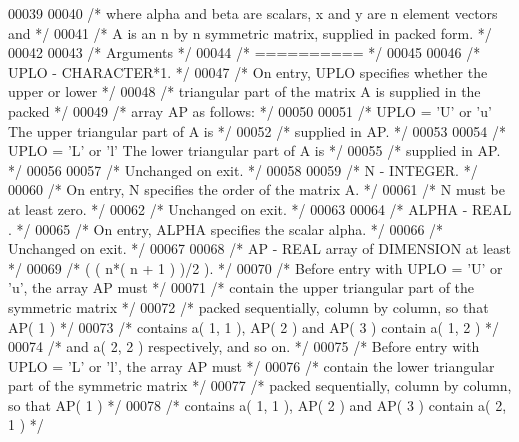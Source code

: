 \begin{DoxyCode}
00039 
00040 \textcolor{comment}{/*  where alpha and beta are scalars, x and y are n element vectors and */}
00041 \textcolor{comment}{/*  A is an n by n symmetric matrix, supplied in packed form. */}
00042 
00043 \textcolor{comment}{/*  Arguments */}
00044 \textcolor{comment}{/*  ========== */}
00045 
00046 \textcolor{comment}{/*  UPLO   - CHARACTER*1. */}
00047 \textcolor{comment}{/*           On entry, UPLO specifies whether the upper or lower */}
00048 \textcolor{comment}{/*           triangular part of the matrix A is supplied in the packed */}
00049 \textcolor{comment}{/*           array AP as follows: */}
00050 
00051 \textcolor{comment}{/*              UPLO = 'U' or 'u'   The upper triangular part of A is */}
00052 \textcolor{comment}{/*                                  supplied in AP. */}
00053 
00054 \textcolor{comment}{/*              UPLO = 'L' or 'l'   The lower triangular part of A is */}
00055 \textcolor{comment}{/*                                  supplied in AP. */}
00056 
00057 \textcolor{comment}{/*           Unchanged on exit. */}
00058 
00059 \textcolor{comment}{/*  N      - INTEGER. */}
00060 \textcolor{comment}{/*           On entry, N specifies the order of the matrix A. */}
00061 \textcolor{comment}{/*           N must be at least zero. */}
00062 \textcolor{comment}{/*           Unchanged on exit. */}
00063 
00064 \textcolor{comment}{/*  ALPHA  - REAL            . */}
00065 \textcolor{comment}{/*           On entry, ALPHA specifies the scalar alpha. */}
00066 \textcolor{comment}{/*           Unchanged on exit. */}
00067 
00068 \textcolor{comment}{/*  AP     - REAL             array of DIMENSION at least */}
00069 \textcolor{comment}{/*           ( ( n*( n + 1 ) )/2 ). */}
00070 \textcolor{comment}{/*           Before entry with UPLO = 'U' or 'u', the array AP must */}
00071 \textcolor{comment}{/*           contain the upper triangular part of the symmetric matrix */}
00072 \textcolor{comment}{/*           packed sequentially, column by column, so that AP( 1 ) */}
00073 \textcolor{comment}{/*           contains a( 1, 1 ), AP( 2 ) and AP( 3 ) contain a( 1, 2 ) */}
00074 \textcolor{comment}{/*           and a( 2, 2 ) respectively, and so on. */}
00075 \textcolor{comment}{/*           Before entry with UPLO = 'L' or 'l', the array AP must */}
00076 \textcolor{comment}{/*           contain the lower triangular part of the symmetric matrix */}
00077 \textcolor{comment}{/*           packed sequentially, column by column, so that AP( 1 ) */}
00078 \textcolor{comment}{/*           contains a( 1, 1 ), AP( 2 ) and AP( 3 ) contain a( 2, 1 ) */}

\end{DoxyCode}
